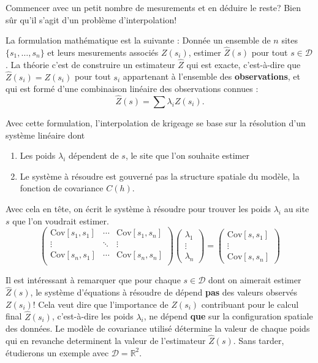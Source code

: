\documentclass[10pt]{article} %
\begin{document}
    Commencer avec un petit nombre de mesurements et en déduire le reste? Bien sûr qu'il s'agit d'un problème d'interpolation!

La formulation mathématique est la suivante : Donnée un ensemble de $n$ sites $\{s_1, \dots, s_n\}$ et leurs mesurements associés $Z(s_i)$, estimer
$\hat Z(s)$ pour tout $s \in \mathcal{D}$. La théorie c'est de construire un estimateur $\hat Z$ qui est exacte, c'est-à-dire que $\hat Z(s_i) = Z(s_i)$ pour
tout $s_i$ appartenant à l'ensemble des \textbf{observations}, et qui est formé d'une combinaison linéaire des observations connues :
$$ \hat Z(s) =  \sum \lambda_i Z(s_i).$$

Avec cette formulation, l'interpolation de krigeage se base sur la résolution d'un système linéaire dont
\begin{enumerate}
    \item Les poids $\lambda_i$ dépendent de $s$, le site que l'on souhaite estimer
    \item Le système à résoudre est gouverné pas la structure spatiale du modèle, la fonction de covariance $C(h)$.
\end{enumerate}

Avec cela en tête, on écrit le système à résoudre pour trouver les poids $\lambda_i$ au site $s$ que l'on voudrait estimer.
\begin{equation}
\begin{pmatrix}
    \text{Cov}[s_1, s_1] & \cdots & \text{Cov}[s_1, s_n] \\
    \vdots & \ddots & \vdots \\
    \text{Cov}[s_n, s_1] & \cdots & \text{Cov}[s_n, s_n] \\
\end{pmatrix}
\begin{pmatrix}
    \lambda_1 \\
    \vdots \\
    \lambda_n
\end{pmatrix}
=
\begin{pmatrix}
    \text{Cov}[s, s_1] \\
    \vdots \\
    \text{Cov}[s, s_n]
\end{pmatrix}
\end{equation}

Il est intéressant à remarquer que pour chaque $s \in \mathcal{D}$ dont on aimerait estimer $\hat Z(s)$, le système d'équations à résoudre de dépend
\textbf{pas} des valeurs observés $Z(s_i)$! Cela veut dire que l'importance de $Z(s_i)$ contribuant pour le calcul final $\hat Z(s_i)$, c'est-à-dire les poids $\lambda_i$, ne dépend \textbf{que}
sur la configuration spatiale des données. Le modèle de covariance utilisé détermine la valeur de chaque poids qui en revanche determinent la valeur de l'estimateur
$\hat Z(s)$. Sans tarder, étudierons un exemple avec $\mathcal{D} = \mathbb{R}^2$.
\end{document}
